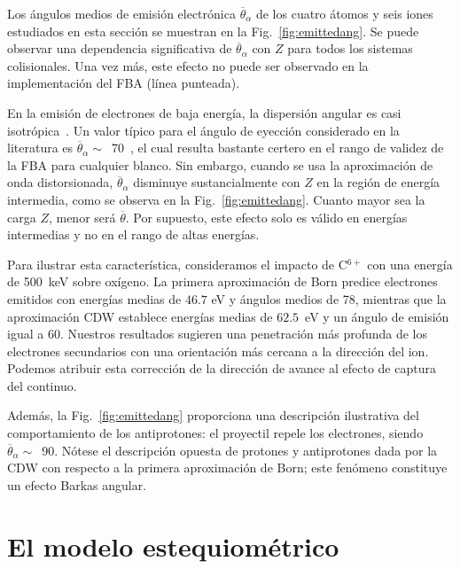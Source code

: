 Los ángulos medios de emisión electrónica $\overline{\theta}_{\alpha}$ 
de los cuatro átomos y seis iones estudiados en esta sección se muestran 
en la Fig.~\ref{fig:emittedang}. Se puede observar una dependencia 
significativa de $\overline{\theta}_{\alpha}$ con $Z$ para todos los 
sistemas colisionales. Una vez más, este efecto no puede ser observado en 
la implementación del FBA (línea punteada).

En la emisión de electrones de baja energía, la dispersión angular es 
casi isotrópica~\cite{Rudd:92}. Un valor típico para el ángulo de 
eyección considerado en la literatura es 
$\overline{\theta}_{\alpha}\sim$~70\textdegree~\cite{Surdutovic:18}, el 
cual resulta bastante certero en el rango de validez de la FBA para 
cualquier blanco. Sin embargo, cuando se usa la aproximación de onda 
distorsionada, $\overline{\theta}_{\alpha}$ disminuye sustancialmente con 
$Z$ en la región de energía intermedia, como se observa en la 
Fig.~\ref{fig:emittedang}. Cuanto mayor sea la carga $Z$, menor será 
$\overline{\theta}$. Por supuesto, este efecto solo es válido en energías 
intermedias y no en el rango de altas energías.

Para ilustrar esta característica, consideramos el impacto de C$^{6+}$ 
con una energía de 500~keV sobre oxígeno. La primera aproximación de Born 
predice electrones emitidos con energías medias de $46.7$ eV y ángulos 
medios de 78\textdegree, mientras que la aproximación CDW establece 
energías medias de $62.5$~eV y un ángulo de emisión igual a 60\textdegree. 
Nuestros resultados sugieren una penetración más profunda de los 
electrones secundarios con una orientación más cercana a la dirección del 
ion. Podemos atribuir esta corrección de la dirección de avance al efecto 
de captura del continuo.

Además, la Fig.~\ref{fig:emittedang} proporciona una descripción 
ilustrativa del comportamiento de los antiprotones: el proyectil repele 
los electrones, siendo $\overline{\theta}_{\alpha}\sim$~90\textdegree. 
Nótese el descripción opuesta de protones y antiprotones dada por la CDW 
con respecto a la primera aproximación de Born; este fenómeno constituye 
un efecto Barkas angular.

\section{El modelo estequiométrico}
\label{sec:SSM}

